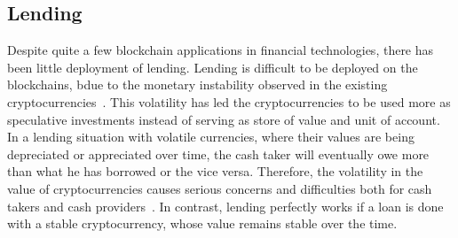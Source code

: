

\subsection{Lending}

Despite quite a few blockchain applications in financial technologies, there has been little deployment of lending.
Lending is difficult to be deployed on the blockchains, bdue to the monetary instability observed in the existing cryptocurrencies~\cite{okoyetoward}. This volatility has led the cryptocurrencies to be used more as speculative investments instead of serving as store of value and unit of account. In a lending situation with volatile currencies, where their values are being depreciated or appreciated over time, the cash taker will eventually owe more than what he has borrowed or the vice versa. Therefore, the volatility in the value of cryptocurrencies causes serious concerns and difficulties both for cash takers and cash providers~\cite{okoyetoward}. In contrast, lending perfectly works if a loan is done with a stable cryptocurrency, whose value remains stable over the time.



%
%

%
%
%
%



